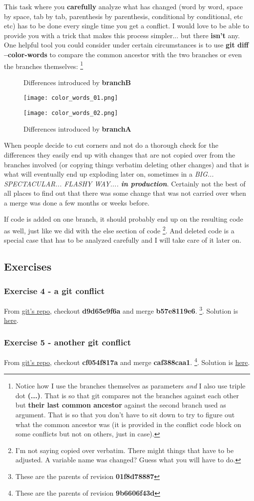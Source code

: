 This task where you {\bf carefully} analyze what has changed (word by word, space by space, tab by tab, parenthesis by parenthesis,
conditional by conditional, etc etc) has to be done every single time you get a conflict. I would love to be able to provide you with
a trick that makes this process simpler... but there {\bf isn't} any. One helpful tool you could consider under
certain circumstances is to use {\bf git diff --color-words} to compare the common ancestor with the
two branches or even the branches themselves:
\footnote{Notice how I use the branches themselves as parameters {\it and} I also use triple dot {\bf (...)}. That is so that git compares
not the branches against each other but {\bf their last common ancestor} against the second branch used as argument. That is so that you don't have
to sit down to try to figure out what the common ancestor was (it is provided in the conflict code block on some conflicts but not on
others, just in case).}


\begin{figure}[h]
	\centering
	\caption{Differences introduced by {\bf branchB}}
	\texttt{[image: color\_words\_01.png]}
	\caption{Differences introduced by {\bf branchA}}
	\texttt{[image: color\_words\_02.png]}
\end{figure}

When people decide to cut corners and not do a thorough check for the differences they easily end up with changes that are
not copied over from the branches involved (or copying things verbatim deleting other changes) and that is what will
eventually end up exploding later on, sometimes in a {\it BIG... SPECTACULAR... FLASHY WAY.... {\bf in production}}. Certainly not
the best of all places to find out that there was some change that was not carried over when a merge was done a few
months or weeks before.

If code is added on one branch, it should probably end up on the resulting code as well, just like we did with the else section of
code \footnote{I'm not saying copied over verbatim. There might things that have to be adjusted. A variable name was changed? Guess
what you will have to do.}. And deleted code is a special case that has to be analyzed carefully and I will take care of it later on.

\subsection{Exercises}
\subsubsection{Exercise 4 - a git conflict}
From \hyperref[git_repo]{git's repo}, checkout {\bf d9d65e9f6a} and merge {\bf b57e8119e6}.
\footnote{These are the parents of revision {\bf 01f8d78887}}. Solution is \hyperref[exercise_04]{here}.

\subsubsection{Exercise 5 - another git conflict}
From \hyperref[git_repo]{git's repo}, checkout {\bf cf054f817a} and merge {\bf caf388caa1}.
\footnote{These are the parents of revision {\bf 9b6606f43d}}. Solution is \hyperref[exercise_05]{here}.
